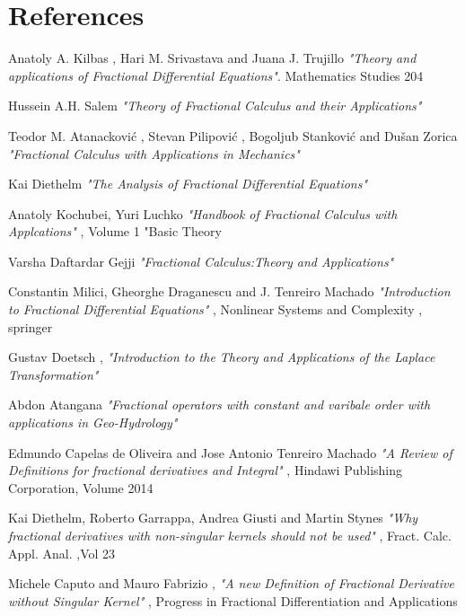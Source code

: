 \documentclass[twoside]{book}
\begin{document}
{%
\newpage
\chapter*{References}
\begin{enumerate}[label={[\arabic*]}]
    \item Anatoly A. Kilbas , Hari M. Srivastava and Juana J. Trujillo \textit{"Theory and applications of Fractional Differential Equations"}. Mathematics Studies 204
    \item Hussein A.H. Salem \textit{"Theory of Fractional Calculus and their Applications"}
    \item Teodor M. Atanacković , Stevan Pilipović , Bogoljub Stanković and Dušan Zorica \textit{"Fractional Calculus with Applications in Mechanics"}
    \item Kai Diethelm \textit{"The Analysis of Fractional Differential Equations"}
    \item Anatoly Kochubei, Yuri Luchko \textit{"Handbook of Fractional Calculus with Applcations"} , Volume 1 "Basic Theory
    \item Varsha Daftardar Gejji  \textit{"Fractional Calculus:Theory and Applications"}
    \item Constantin Milici, Gheorghe Draganescu and J. Tenreiro Machado \textit{"Introduction to Fractional Differential Equations"} , Nonlinear Systems and Complexity , springer
    \item Gustav Doetsch , \textit{"Introduction to the Theory and Applications of the Laplace Transformation"}
    \item Abdon Atangana \textit{"Fractional operators with constant and varibale order with applications in Geo-Hydrology"}
    \item Edmundo Capelas de Oliveira and Jose Antonio Tenreiro Machado \textit{"A Review of Definitions for fractional derivatives and Integral"} , Hindawi Publishing Corporation, Volume 2014
    \item  Kai Diethelm, Roberto Garrappa, Andrea Giusti and Martin Stynes \textit{"Why fractional derivatives with non-singular kernels should not be used"} , Fract. Calc. Appl. Anal. ,Vol 23
    \item Michele Caputo and Mauro Fabrizio , \textit{"A new Definition of Fractional Derivative without Singular Kernel"} , Progress in Fractional Differentiation and Applications

\end{enumerate}}
\end{document}

